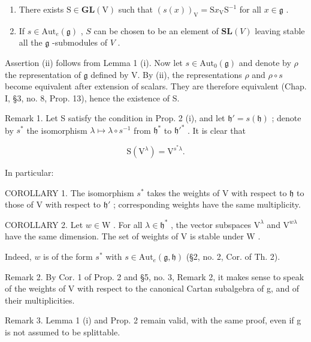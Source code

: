 \begin{enumerate}
\def\labelenumi{(\roman{enumi})}
\item
  There exists \(\mathrm{S} \in \mathbf{GL}(\mathrm{V})\) such that \((s(x))_{\mathrm{V}} = \mathrm{S}x_{\mathrm{V}}\mathrm{S}^{-1}\) for all \(x \in \mathfrak{g}\) .
\item
  If \(s \in \mathrm{Aut}_e(\mathfrak{g})\) , \(S\) can be chosen to be an element of \(\mathbf{SL}(V)\) leaving stable all the \(\mathfrak{g}\) -submodules of \(V\) .
\end{enumerate}

Assertion (ii) follows from Lemma 1 (i). Now let \(s \in \mathrm{Aut}_0(\mathfrak{g})\) and denote by \(\rho\) the representation of \(\mathfrak{g}\) defined by V. By (ii), the representations \(\rho\) and \(\rho \circ s\) become equivalent after extension of scalars. They are therefore equivalent (Chap. I, §3, no. 8, Prop. 13), hence the existence of S.

Remark 1. Let S satisfy the condition in Prop. 2 (i), and let \(\mathfrak{h}' = s(\mathfrak{h})\) ; denote by \(s^*\) the isomorphism \(\lambda \mapsto \lambda \circ s^{-1}\) from \(\mathfrak{h}^*\) to \(\mathfrak{h}'^*\) . It is clear that

\[
\mathrm{S} (\mathrm{V} ^ {\lambda}) = \mathrm{V} ^ {s ^ {*} \lambda}.
\]

In particular:

COROLLARY 1. The isomorphism \(s^*\) takes the weights of V with respect to \(\mathfrak{h}\) to those of V with respect to \(\mathfrak{h}'\) ; corresponding weights have the same multiplicity.

COROLLARY 2. Let \(w \in \mathrm{W}\) . For all \(\lambda \in \mathfrak{h}^*\) , the vector subspaces \(\mathrm{V}^{\lambda}\) and \(\mathrm{V}^{w\lambda}\) have the same dimension. The set of weights of \(\mathrm{V}\) is stable under \(\mathrm{W}\) .

Indeed, \(w\) is of the form \(s^*\) with \(s \in \mathrm{Aut}_e(\mathfrak{g}, \mathfrak{h})\) (§2, no. 2, Cor. of Th. 2).

Remark 2. By Cor. 1 of Prop. 2 and §5, no. 3, Remark 2, it makes sense to speak of the weights of V with respect to the canonical Cartan subalgebra of g, and of their multiplicities.

Remark 3. Lemma 1 (i) and Prop. 2 remain valid, with the same proof, even if g is not assumed to be splittable.


